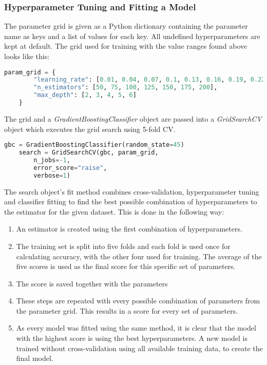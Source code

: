\subsubsection{Hyperparameter Tuning and Fitting a Model}

The parameter grid is given as a Python dictionary containing the parameter name as keys and a list of values for
each key. All undefined hyperparameters are kept at default.
The grid used for training with the value ranges found above looks like this:

\begin{lstlisting}[language=Python]
    param_grid = {
        "learning_rate": [0.01, 0.04, 0.07, 0.1, 0.13, 0.16, 0.19, 0.22, 0.25],
        "n_estimators": [50, 75, 100, 125, 150, 175, 200],
        "max_depth": [2, 3, 4, 5, 6]
    }
\end{lstlisting}

The grid and a \emph{GradientBoostingClassifier} object are passed into a \emph{GridSearchCV} object
which executes the grid search using 5-fold CV.

\begin{lstlisting}[language=Python]
    gbc = GradientBoostingClassifier(random_state=45)    
    search = GridSearchCV(gbc, param_grid,
        n_jobs=-1,
        error_score="raise",
        verbose=1)
\end{lstlisting}

The search object's fit method combines cross-validation, hyperparameter tuning and classifier
fitting to find the best possible combination of hyperparameters to the estimator for the given dataset.
This is done in the following way:

\begin{enumerate}
    \item An estimator is created using the first combination of hyperparameters.
    \item The training set is split into five folds and each fold is used once for calculating accuracy,
    with the other four used for training. The average of the five scores is used as the final score for
    this specific set of parameters.
    \item The score is saved together with the parameters
    \item These steps are repeated with every possible combination of parameters from the 
    parameter grid. This results in a score for every set of parameters.
    \item As every model was fitted using the same method, it is clear that the model with the highest
    score is using the best hyperparameters. A new model is trained without cross-validation using all
    available training data, to create the final model.
\end{enumerate}

